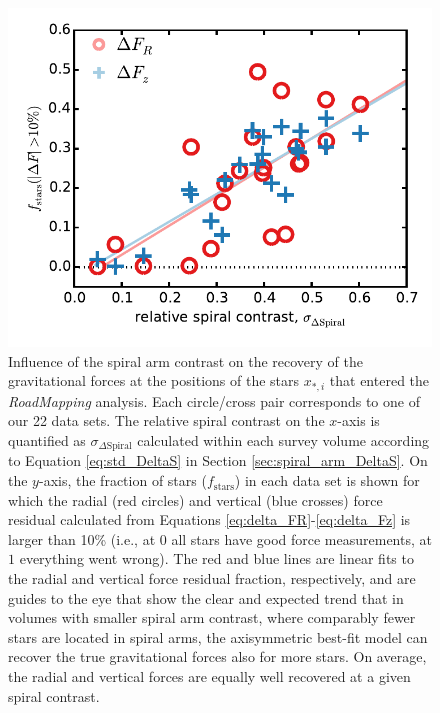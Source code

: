 \documentclass[iop,revtex4,numberedappendix,appendixfloats]{emulateapj}
\newcommand{\RM}{{\sl RoadMapping}}
\begin{document}
\begin{figure}[!htbp]
\centering
\includegraphics[width=\columnwidth]{fig/MNdHHdiffSph2_plot_stdkappa_vs_frac10star_3.pdf}
\caption{Influence of the spiral arm contrast on the recovery of the gravitational forces at the positions of the stars $x_{*,i}$ that entered the \RM{} analysis. Each circle/cross pair corresponds to one of our 22 data sets. The relative spiral contrast on the $x$-axis is quantified as $\sigma_{\Delta\text{Spiral}}$ calculated within each survey volume according to Equation \eqref{eq:std_DeltaS} in Section \ref{sec:spiral_arm_DeltaS}. On the $y$-axis, the fraction of stars ($f_\text{stars}$) in each data set is shown for which the radial (red circles) and vertical (blue crosses) force residual calculated from Equations \eqref{eq:delta_FR}-\eqref{eq:delta_Fz} is larger than 10\% (i.e., at $0$ all stars have good force measurements, at $1$ everything went wrong). The red and blue lines are linear fits to the radial and vertical force residual fraction, respectively, and are guides to the eye that show the clear and expected trend that in volumes with smaller spiral arm contrast, where comparably fewer stars are located in spiral arms, the axisymmetric best-fit model can recover the true gravitational forces also for more stars. On average, the radial and vertical forces are equally well recovered at a given spiral contrast.}
\label{fig:std_DeltaS_vs_frac10_stars}
\end{figure}
\end{document}
